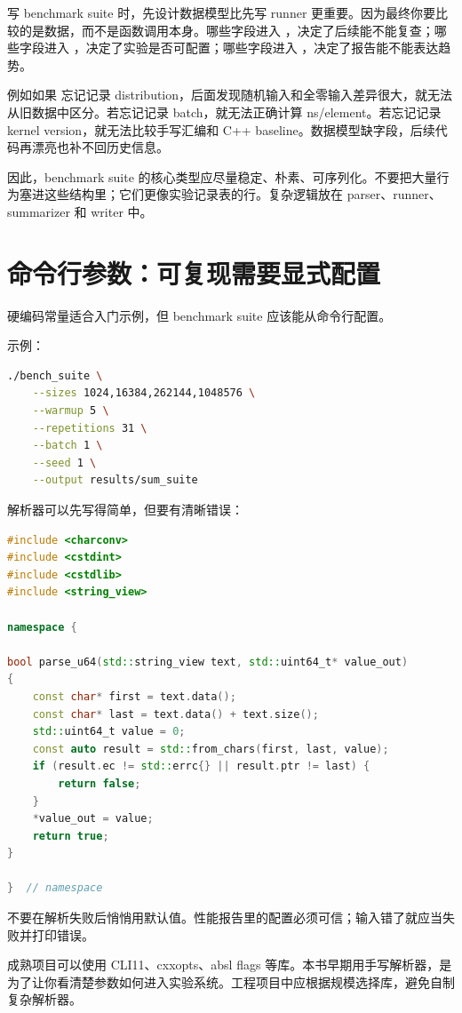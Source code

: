 写 benchmark suite 时，先设计数据模型比先写 runner 更重要。因为最终你要比较的是数据，而不是函数调用本身。哪些字段进入 ，决定了后续能不能复查；哪些字段进入 ，决定了实验是否可配置；哪些字段进入 ，决定了报告能不能表达趋势。

例如如果  忘记记录 distribution，后面发现随机输入和全零输入差异很大，就无法从旧数据中区分。若忘记记录 batch，就无法正确计算 ns/element。若忘记记录 kernel version，就无法比较手写汇编和 C++ baseline。数据模型缺字段，后续代码再漂亮也补不回历史信息。

因此，benchmark suite 的核心类型应尽量稳定、朴素、可序列化。不要把大量行为塞进这些结构里；它们更像实验记录表的行。复杂逻辑放在 parser、runner、summarizer 和 writer 中。

\section{命令行参数：可复现需要显式配置}

硬编码常量适合入门示例，但 benchmark suite 应该能从命令行配置。

示例：

\begin{lstlisting}[language=bash]
./bench_suite \
    --sizes 1024,16384,262144,1048576 \
    --warmup 5 \
    --repetitions 31 \
    --batch 1 \
    --seed 1 \
    --output results/sum_suite
\end{lstlisting}

解析器可以先写得简单，但要有清晰错误：

\begin{lstlisting}[language=C++]
#include <charconv>
#include <cstdint>
#include <cstdlib>
#include <string_view>

namespace {

bool parse_u64(std::string_view text, std::uint64_t* value_out)
{
    const char* first = text.data();
    const char* last = text.data() + text.size();
    std::uint64_t value = 0;
    const auto result = std::from_chars(first, last, value);
    if (result.ec != std::errc{} || result.ptr != last) {
        return false;
    }
    *value_out = value;
    return true;
}

}  // namespace
\end{lstlisting}

不要在解析失败后悄悄用默认值。性能报告里的配置必须可信；输入错了就应当失败并打印错误。

\begin{deepdive}
成熟项目可以使用 CLI11、cxxopts、absl flags 等库。本书早期用手写解析器，是为了让你看清楚参数如何进入实验系统。工程项目中应根据规模选择库，避免自制复杂解析器。
\end{deepdive}

